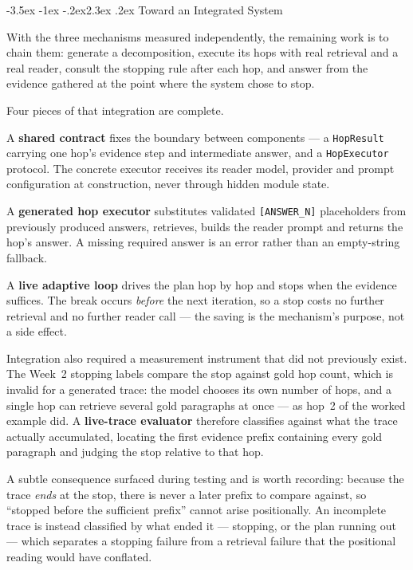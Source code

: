 \documentclass[11pt,a4paper]{article}
\makeatletter
\renewcommand\section{\@startsection{section}{1}{\z@}%
  {-3.5ex \@plus -1ex \@minus -.2ex}{2.3ex \@plus.2ex}%
  {\color{ink}\normalfont\Large\bfseries}}
\newcommand{\code}[1]{\texttt{\small #1}}
\makeatother
\begin{document}
\section{Toward an Integrated System}

With the three mechanisms measured independently, the remaining work is to chain
them: generate a decomposition, execute its hops with real retrieval and a real
reader, consult the stopping rule after each hop, and answer from the evidence
gathered at the point where the system chose to stop.

Four pieces of that integration are complete.

A \textbf{shared contract} fixes the boundary between components --- a
\code{HopResult} carrying one hop's evidence step and intermediate answer, and a
\code{HopExecutor} protocol. The concrete executor receives its reader model,
provider and prompt configuration at construction, never through hidden module
state.

A \textbf{generated hop executor} substitutes validated \code{[ANSWER\_N]}
placeholders from previously produced answers, retrieves, builds the reader
prompt and returns the hop's answer. A missing required answer is an error
rather than an empty-string fallback.

A \textbf{live adaptive loop} drives the plan hop by hop and stops when the
evidence suffices. The break occurs \emph{before} the next iteration, so a stop
costs no further retrieval and no further reader call --- the saving is the
mechanism's purpose, not a side effect.

Integration also required a measurement instrument that did not previously exist.
The Week~2 stopping labels compare the stop against gold hop count, which is
invalid for a generated trace: the model chooses its own number of hops, and a
single hop can retrieve several gold paragraphs at once --- as hop~2 of the
worked example did. A \textbf{live-trace evaluator} therefore classifies against
what the trace actually accumulated, locating the first evidence prefix
containing every gold paragraph and judging the stop relative to that hop.

A subtle consequence surfaced during testing and is worth recording: because the
trace \emph{ends} at the stop, there is never a later prefix to compare against,
so ``stopped before the sufficient prefix'' cannot arise positionally. An
incomplete trace is instead classified by what ended it --- stopping, or the plan
running out --- which separates a stopping failure from a retrieval failure that
the positional reading would have conflated.
\end{document}
